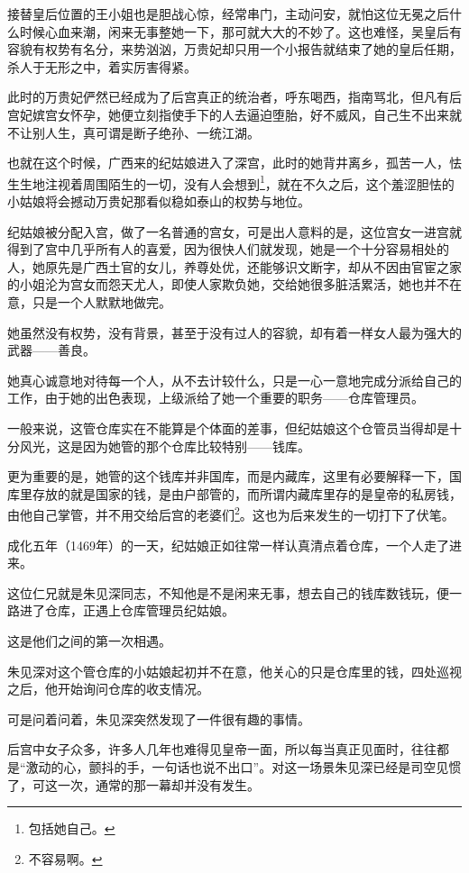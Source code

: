 \begin{multicols}{\theparacolNo}
接替皇后位置的王小姐也是胆战心惊，经常串门，主动问安，就怕这位无冕之后什么时候心血来潮，闲来无事整她一下，那可就大大的不妙了。这也难怪，吴皇后有容貌有权势有名分，来势汹汹，万贵妃却只用一个小报告就结束了她的皇后任期，杀人于无形之中，着实厉害得紧。

此时的万贵妃俨然已经成为了后宫真正的统治者，呼东喝西，指南骂北，但凡有后宫妃嫔宫女怀孕，她便立刻指使手下的人去逼迫堕胎，好不威风，自己生不出来就不让别人生，真可谓是断子绝孙、一统江湖。

也就在这个时候，广西来的纪姑娘进入了深宫，此时的她背井离乡，孤苦一人，怯生生地注视着周围陌生的一切，没有人会想到\footnote{包括她自己。}，就在不久之后，这个羞涩胆怯的小姑娘将会撼动万贵妃那看似稳如泰山的权势与地位。

纪姑娘被分配入宫，做了一名普通的宫女，可是出人意料的是，这位宫女一进宫就得到了宫中几乎所有人的喜爱，因为很快人们就发现，她是一个十分容易相处的人，她原先是广西土官的女儿，养尊处优，还能够识文断字，却从不因由官宦之家的小姐沦为宫女而怨天尤人，即使人家欺负她，交给她很多脏活累活，她也并不在意，只是一个人默默地做完。

她虽然没有权势，没有背景，甚至于没有过人的容貌，却有着一样女人最为强大的武器——善良。

她真心诚意地对待每一个人，从不去计较什么，只是一心一意地完成分派给自己的工作，由于她的出色表现，上级派给了她一个重要的职务——仓库管理员。

一般来说，这管仓库实在不能算是个体面的差事，但纪姑娘这个仓管员当得却是十分风光，这是因为她管的那个仓库比较特别——钱库。

更为重要的是，她管的这个钱库并非国库，而是内藏库，这里有必要解释一下，国库里存放的就是国家的钱，是由户部管的，而所谓内藏库里存的是皇帝的私房钱，由他自己掌管，并不用交给后宫的老婆们\footnote{不容易啊。}。这也为后来发生的一切打下了伏笔。

成化五年（1469年）的一天，纪姑娘正如往常一样认真清点着仓库，一个人走了进来。

这位仁兄就是朱见深同志，不知他是不是闲来无事，想去自己的钱库数钱玩，便一路进了仓库，正遇上仓库管理员纪姑娘。

这是他们之间的第一次相遇。

朱见深对这个管仓库的小姑娘起初并不在意，他关心的只是仓库里的钱，四处巡视之后，他开始询问仓库的收支情况。

可是问着问着，朱见深突然发现了一件很有趣的事情。

后宫中女子众多，许多人几年也难得见皇帝一面，所以每当真正见面时，往往都是“激动的心，颤抖的手，一句话也说不出口”。对这一场景朱见深已经是司空见惯了，可这一次，通常的那一幕却并没有发生。


\end{multicols}
